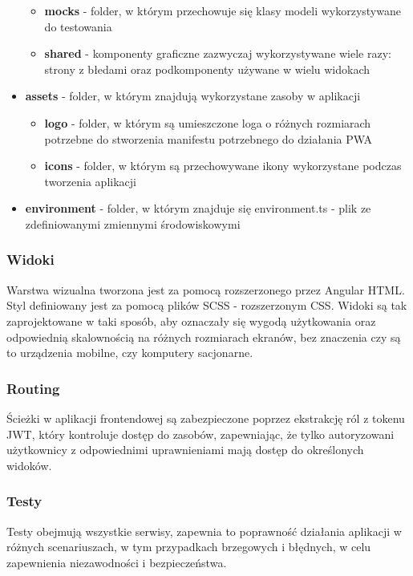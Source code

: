 \documentclass[../../main.tex]{subfiles}
\begin{document}
\begin{itemize}
\begin{itemize}
\begin{itemize}
            \end{itemize}
            \item \textbf{mocks} - folder, w którym przechowuje się klasy modeli wykorzystywane do testowania
            \item \textbf{shared} - komponenty graficzne zazwyczaj wykorzystywane wiele razy: strony z błedami oraz podkomponenty używane w wielu widokach  
        \end{itemize}
        \item \textbf{assets} - folder, w którym znajdują wykorzystane zasoby w aplikacji
        \begin{itemize}
            \item \textbf{logo} - folder, w którym są umieszczone loga o różnych rozmiarach potrzebne do stworzenia manifestu potrzebnego do działania PWA
            \item \textbf{icons} - folder, w którym są przechowywane ikony wykorzystane podczas tworzenia aplikacji
        \end{itemize}
        \item \textbf{environment} - folder, w którym znajduje się environment.ts - plik ze zdefiniowanymi zmiennymi środowiskowymi
    \end{itemize}

    \subsubsection{Widoki}
    Warstwa wizualna tworzona jest za pomocą rozszerzonego przez Angular HTML. Styl definiowany jest za pomocą plików SCSS - rozszerzonym CSS. Widoki są tak zaprojektowane w taki sposób, aby oznaczały się wygodą użytkowania oraz odpowiednią skalownością na różnych rozmiarach ekranów, bez znaczenia czy są to urządzenia mobilne, czy komputery sacjonarne. 

    \subsubsection{Routing}
    Ścieżki w aplikacji frontendowej są zabezpieczone poprzez ekstrakcję ról z tokenu JWT, który kontroluje dostęp do zasobów, zapewniając, że tylko autoryzowani użytkownicy z odpowiednimi uprawnieniami mają dostęp do określonych widoków.

    \subsubsection{Testy}
    Testy obejmują wszystkie serwisy, zapewnia to poprawność działania aplikacji w różnych scenariuszach, w tym przypadkach brzegowych i błędnych, w celu zapewnienia niezawodności i bezpieczeństwa. %
\end{document}
